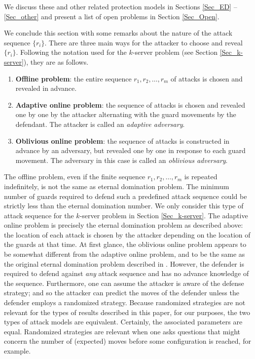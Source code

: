 \documentclass[12pt]{article}%
\begin{document}
We discuss these and other related protection models in Sections \ref{Sec_ED}
-- \ref{Sec_other} and present a list of open problems in Section
\ref{Sec_Open}.

We conclude this section with some remarks about the nature of the attack
sequence $\{r_{i}\}$. There are three main ways for the attacker to choose and
reveal $\{r_{i}\}$. Following the notation used for the $k$-server problem
(see Section \ref{Sec_k-server}), they are as follows.

\begin{enumerate}
\item \textbf{{Offline problem}}: the entire sequence $r_{1},r_{2}%
,\ldots,r_{m}$ of attacks is chosen and revealed in advance.

\item \textbf{{Adaptive online problem}}: the sequence of attacks is chosen
and revealed one by one by the attacker alternating with the guard movements
by the defendant. The attacker is called an \emph{adaptive adversary}.

\item \textbf{{Oblivious online problem}}: the sequence of attacks is
constructed in advance by an adversary, but revealed one by one in response to
each guard movement. The adversary in this case is called an \emph{oblivious
adversary}.
\end{enumerate}

The offline problem, even if the finite sequence $r_{1},r_{2},\ldots,r_{m}$ is
repeated indefinitely, is not the same as eternal domination problem. The
minimum number of guards required to defend such a predefined attack sequence
could be strictly less than the eternal domination number. We only consider
this type of attack sequence for the $k$-server problem in Section
\ref{Sec_k-server}. The adaptive online problem is precisely the eternal
domination problem as described above: the location of each attack is chosen
by the attacker depending on the location of the guards at that time. At first
glance, the oblivious online problem appears to be somewhat different from the
adaptive online problem, and to be the same as the original eternal domination
problem described in \cite{BCG2}. However, the defender is required to defend
against \emph{any }attack sequence and has no advance knowledge of the
sequence. Furthermore, one can assume the attacker is aware of the defense
strategy; and so the attacker can predict the moves of the defender unless the
defender employs a randomized strategy. Because randomized strategies are not
relevant for the types of results described in this paper, for our purposes,
the two types of attack models are equivalent. Certainly, the associated
parameters are equal. Randomized strategies are relevant when one asks
questions that might concern the number of (expected) moves before some
configuration is reached, for example.
\end{document}
